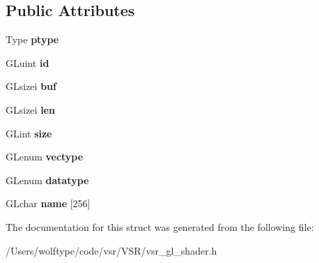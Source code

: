 \subsection*{Public Attributes}
\begin{DoxyCompactItemize}
\item 
\hypertarget{structvsr_1_1_shader_param_adb40b487cab79dd8c6049e2b50a1cc35}{Type {\bfseries ptype}}\label{structvsr_1_1_shader_param_adb40b487cab79dd8c6049e2b50a1cc35}

\item 
\hypertarget{structvsr_1_1_shader_param_acbd48f98d1c16a456964e18aa3248854}{G\-Luint {\bfseries id}}\label{structvsr_1_1_shader_param_acbd48f98d1c16a456964e18aa3248854}

\item 
\hypertarget{structvsr_1_1_shader_param_a394a7f20f1adaea47845eb29254143b1}{G\-Lsizei {\bfseries buf}}\label{structvsr_1_1_shader_param_a394a7f20f1adaea47845eb29254143b1}

\item 
\hypertarget{structvsr_1_1_shader_param_a85196eb5a1a77d749c5c7c9d2e925d02}{G\-Lsizei {\bfseries len}}\label{structvsr_1_1_shader_param_a85196eb5a1a77d749c5c7c9d2e925d02}

\item 
\hypertarget{structvsr_1_1_shader_param_acd8497dc0b44d0ce75ddfe05350cf18d}{G\-Lint {\bfseries size}}\label{structvsr_1_1_shader_param_acd8497dc0b44d0ce75ddfe05350cf18d}

\item 
\hypertarget{structvsr_1_1_shader_param_adeefebf3102aa6d63c492ca57ea2a69e}{G\-Lenum {\bfseries vectype}}\label{structvsr_1_1_shader_param_adeefebf3102aa6d63c492ca57ea2a69e}

\item 
\hypertarget{structvsr_1_1_shader_param_a30a0d6c3ec13067d91a10e1ebedad090}{G\-Lenum {\bfseries datatype}}\label{structvsr_1_1_shader_param_a30a0d6c3ec13067d91a10e1ebedad090}

\item 
\hypertarget{structvsr_1_1_shader_param_a0dc5fac5bab41f8ed6544bb6a8ab8b10}{G\-Lchar {\bfseries name} \mbox{[}256\mbox{]}}\label{structvsr_1_1_shader_param_a0dc5fac5bab41f8ed6544bb6a8ab8b10}

\end{DoxyCompactItemize}


The documentation for this struct was generated from the following file\-:\begin{DoxyCompactItemize}
\item 
/\-Users/wolftype/code/vsr/\-V\-S\-R/vsr\-\_\-gl\-\_\-shader.\-h\end{DoxyCompactItemize}
